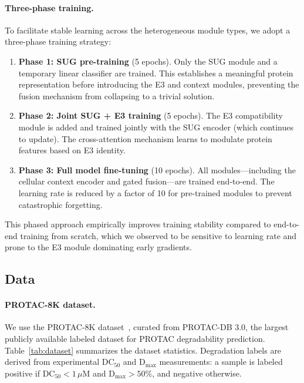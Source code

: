 \documentclass[sigconf]{acmart}
\begin{document}
\paragraph{Three-phase training.}
To facilitate stable learning across the heterogeneous module types, we adopt a three-phase training strategy:
\begin{enumerate}
    \item \textbf{Phase 1: SUG pre-training} (5 epochs). Only the SUG module and a temporary linear classifier are trained. This establishes a meaningful protein representation before introducing the E3 and context modules, preventing the fusion mechanism from collapsing to a trivial solution.
    \item \textbf{Phase 2: Joint SUG + E3 training} (5 epochs). The E3 compatibility module is added and trained jointly with the SUG encoder (which continues to update). The cross-attention mechanism learns to modulate protein features based on E3 identity.
    \item \textbf{Phase 3: Full model fine-tuning} (10 epochs). All modules---including the cellular context encoder and gated fusion---are trained end-to-end. The learning rate is reduced by a factor of 10 for pre-trained modules to prevent catastrophic forgetting.
\end{enumerate}
This phased approach empirically improves training stability compared to end-to-end training from scratch, which we observed to be sensitive to learning rate and prone to the E3 module dominating early gradients.

\subsection{Data}
\label{sec:data}

\paragraph{PROTAC-8K dataset.}
We use the PROTAC-8K dataset~\cite{liu2025degrademaster}, curated from PROTAC-DB 3.0, the largest publicly available labeled dataset for PROTAC degradability prediction.
Table~\ref{tab:dataset} summarizes the dataset statistics.
Degradation labels are derived from experimental DC$_{50}$ and D$_{\text{max}}$ measurements: a sample is labeled positive if DC$_{50} < 1$\,$\mu$M and D$_{\text{max}} > 50\%$, and negative otherwise.
\end{document}
